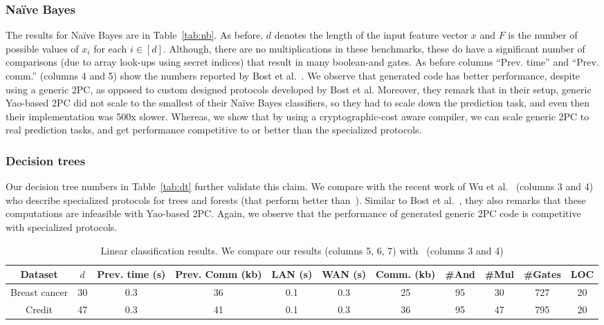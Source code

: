 \subsubsection*{Na\"{i}ve Bayes} The results for Na\"{i}ve Bayes are
in Table~\ref{tab:nb}. As before, $d$ denotes the length of the input
feature vector $x$ and $F$ is the number of possible values of $x_i$
for each $i \in [d]$.
Although, there are no multiplications in these benchmarks, these do
have a significant number of comparisons (due to array look-ups using
secret indices) that
result in many boolean-and gates. %
As before columns ``Prev. time'' and ``Prev. comm.'' (columns 4 and 5)
show the numbers reported
by Bost et al.~\cite{shafindss}. We observe that \tool generated code
has better performance, despite using a generic 2PC,
as opposed to custom designed protocols developed by Bost et
al. Moreover, they remark that in their setup, generic Yao-based 2PC
did not scale to the smallest of their Na\"{i}ve Bayes classifiers, so
they had to scale down the prediction task, and even then their
implementation was 500x slower. Whereas, we show that by using a
cryptographic-cost aware compiler, we can scale generic 2PC to real
prediction tasks, and get performance competitive to or better than the
specialized protocols.

\subsubsection*{Decision trees}
Our decision tree numbers in Table~\ref{tab:dt} further validate
this claim. We compare with the recent work of Wu et al.~\cite{wu} (columns 3 and 4) who
describe specialized protocols for trees and forests (that perform
better than~\cite{shafindss}).
Similar to Bost et al.~\cite{shafindss}, they also remarks that these
computations are infeasible with Yao-based 2PC.
Again, we observe that
the performance of \tool generated generic 2PC
code is competitive with specialized protocols. 

\begin{table*}
\begin{tabular}{c|c|c|c|c |c|c|c|c|c|c}
Dataset & $d$  & Prev. time (s) & Prev. Comm (kb) & LAN (s) & WAN (s) & Comm. (kb)  & \#And & \#Mul & \#Gates & LOC\\
\hline
Breast cancer & 30 & 0.3 & 36 & 0.1 & 0.3 & 25 & 95 & 30 & 727 & 20\\
\hline
Credit & 47 & 0.3 & 41 & 0.1 & 0.3 & 36 & 95 & 47 & 795 & 20\\
\hline
\end{tabular}

 \caption{Linear classification results. We compare our results (columns 5, 6, 7) with~\cite{shafindss} (columns 3 and 4)}
 \label{tab:lc} 
\end{table*}

